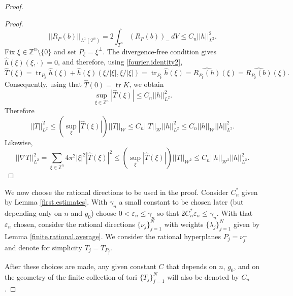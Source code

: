 \documentclass[11pt]{amsart}
\def\Z{\mathbb Z}
\def\tr{\operatorname{tr}}
\theoremstyle{remark}
\theoremstyle{definition}
\begin{document}
\begin{proof}
\begin{proof}
			$$
			||R_P(b)||_{L^1(T^n)}=2\int_{T^n}(R_P(b))_-\,dV\leq C_n||h||^2_{L^2}.
			$$
			Fix $\xi\in\mathbb Z^n\setminus\{0\}$ and set $P_\xi=\xi^{\bot}$. The divergence-free condition gives $\widehat h(\xi)(\xi,\cdot)=0$, and therefore, using \eqref{fourier.identity2}, 
			$$
			\widehat T(\xi)=\tr _{P_\xi}\widehat h(\xi)+\widehat h(\xi)(\xi/|\xi|,\xi/|\xi|)=\tr _{P_\xi}\widehat h(\xi){=\widehat{R_{P_\xi}(h)}(\xi)=\widehat{R_{P_\xi}(b)}(\xi).}
			$$
			Consequently, using that $\widehat T(0)=\tr K$, we obtain
			$$
			\sup_{\xi\in\mathbb Z^n}|\widehat T(\xi)|\leq C_n||h||^2_{L^2}.
			$$
			Therefore
			$$
			||T||_{L^2}^2\leq\left(\sup_\xi|\widehat T(\xi)|\right)||T||_{\mathcal W}\leq C_n||T||_{\mathcal W} ||h||^2_{L^2}\leq C_n||h||_{\mathcal W} ||h||^2_{L^2} .
			$$
			Likewise,
			$$
			||\nabla T||_{L^2}^2=\sum_{\xi\in\Z^n}4\pi^2|\xi|^2|\widehat T(\xi)|^2\leq\left(\sup_\xi|\widehat T(\xi)|\right)||T||_{\mathcal W^2}\leq C_n||h||_{\mathcal W^2}||h||_{L^2}^2.
			$$
		\end{proof}
		We now choose the rational directions {to be} used in the proof.  Consider $C^*_n$ given by Lemma \ref{first.estimates}. With $\gamma_n$ a small constant to be chosen later (but depending only on $n$ {and $g_0$}) choose $0<\varepsilon_n\leq \gamma_n$ so that $2C^*_n\varepsilon_n\leq \gamma_n$. With that $\varepsilon_n$ chosen,  consider the rational directions $\{\nu_j\}_{j=1}^N$ with weights  $\{\lambda_j\}_{j=1}^N$ given by Lemma \ref{finite.rational.average}. We consider the rational hyperplanes $P_j=\nu_j^\perp$ and denote for simplicity $T_j=T_{P_j}.$ 
		
		After these choices are made,  any given constant $C$ that depends {on $n$, $g_0$,} and on  the geometry of the finite  collection of tori $\{T_j\}_{j=1}^N$  will also be denoted by $C_n$.
		

\end{proof}
\end{document}
